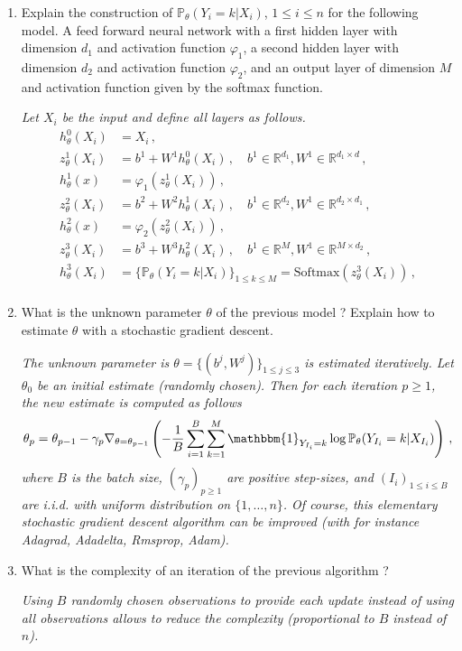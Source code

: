 \documentclass[a4paper,10pt,fleqn]{article}
\newcommand{\eqsp}{\,}
\newcommand{\1}{\ensuremath{\mathbbm{1}}}
\begin{document}
\begin{enumerate}
\item Explain the construction of $\mathbb{P}_{\theta}(Y_i = k | X_i)$, $1\leqslant i\leqslant n$ for the following model. A feed forward neural network with a first hidden layer with dimension $d_1$ and activation function $\varphi_1$,  a second hidden layer with dimension $d_2$ and activation function $\varphi_2$, and an output layer of dimension $M$ and activation function given by the softmax function.

\vspace{.2cm}

{\em
Let $X_i$ be the input and define all layers as follows.
\begin{align*}
h_{\theta}^0(X_i) &= X_i\eqsp,\\
z_{\theta}^1(X_i)  &= b^1 + W^1h_{\theta}^{0}(X_i)\eqsp, \quad b^1\in\mathbb{R}^{d_1}, W^1 \in\mathbb{R}^{d_1\times d}\eqsp,\\
h_{\theta}^1(x)  &= \varphi_1(z_{\theta}^{1}(X_i))\eqsp,\\
z_{\theta}^2(X_i)  &= b^2 + W^2h_{\theta}^{1}(X_i)\eqsp,\quad b^1\in\mathbb{R}^{d_2}, W^1 \in\mathbb{R}^{d_2\times d_1}\eqsp,\\
h_{\theta}^2(x)  &= \varphi_2(z_{\theta}^{2}(X_i))\eqsp,\\
z_{\theta}^3(X_i)  &= b^3 + W^3h_{\theta}^{2}(X_i)\eqsp,\quad b^1\in\mathbb{R}^{M}, W^1 \in\mathbb{R}^{M\times d_2}\eqsp,\\
h_{\theta}^3(X_i)  &= \{\mathbb{P}_{\theta}(Y_i = k | X_i)\}_{1\leq k \leq M} = \mathrm{Softmax}(z_{\theta}^{3}(X_i))\eqsp,\\
\end{align*}
}
\item What is the unknown parameter $\theta$ of the previous model ? Explain how to estimate $\theta$ with  a stochastic gradient descent.

\vspace{.2cm}

{\em
The unknown parameter is $\theta = \{(b^j,W^j)\}_{1\leq j \leq 3}$ is estimated iteratively. Let $\theta_0$ be an initial estimate (randomly chosen). Then for each iteration $p\geqslant 1$, the new estimate is computed as follows
$$
\theta_p = \theta_{p-1} - \gamma_p \nabla_{\theta=\theta_{p-1}} \left(-\frac{1}{B} \sum_{i=1}^B\sum_{k=1}^{M} \1_{Y_{I_i}=k}\log \mathbb{P}_{\theta}(Y_{I_i} = k | X_{I_i})\right)\eqsp,
$$
where $B$ is the batch size, $(\gamma_p)_{p\geqslant 1}$ are positive step-sizes, and $(I_i)_{1 \leqslant i \leqslant B}$ are i.i.d. with uniform distribution on  $\{1,\ldots,n\}$. Of course, this elementary stochastic gradient descent algorithm can be improved (with for instance Adagrad, Adadelta, Rmsprop, Adam).
}
\item What is the complexity of an iteration of the previous algorithm ?

\vspace{.2cm}

{\em
Using $B$ randomly chosen observations to provide each update instead of using all observations allows to reduce the complexity (proportional to $B$ instead of $n$).
}
\end{enumerate}
\end{document}
